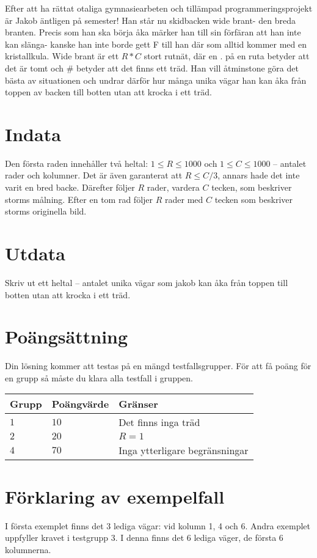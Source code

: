 Efter att ha rättat otaliga gymnasiearbeten och tillämpad programmeringsprojekt är Jakob äntligen på semester! Han står nu skidbacken wide brant- den breda branten.
Precis som han ska börja åka märker han till sin förfäran att han inte kan slänga- kanske han inte borde gett F till han där som alltid kommer med en kristallkula.
Wide brant är ett $R*C$ stort rutnät, där en . på en ruta betyder att det är tomt och \# betyder att det finns ett träd. 
Han vill åtminstone göra det bästa av situationen och undrar därför hur många unika vägar han kan åka från toppen av backen till botten utan att krocka i ett träd.

\section*{Indata}
Den första raden innehåller två heltal: $1\leq R \leq 1000$ och $1 \leq C \leq 1000$ -- antalet rader och kolumner. Det är även garanterat att $R \leq C/3$, annars hade det inte varit en bred backe.
Därefter följer $R$ rader, vardera $C$ tecken, som beskriver storms målning. 
Efter en tom rad följer $R$ rader med $C$ tecken som beskriver storms originella bild. 

\section*{Utdata}
Skriv ut ett heltal -- antalet unika vägar som jakob kan åka från toppen till botten utan att krocka i ett träd.

\section*{Poängsättning}
Din lösning kommer att testas på en mängd testfallsgrupper.
För att få poäng för en grupp så måste du klara alla testfall i gruppen.

\noindent
\begin{tabular}{| l | l | p{12cm} |}
  \hline
  Grupp & Poängvärde & Gränser \\ \hline
  $1$   & $10$       & Det finns inga träd \\ \hline
  $2$   & $20$       & $R=1$ \\ \hline
  $4$   & $70$       & Inga ytterligare begränsningar  \\ \hline
\end{tabular}

\section*{Förklaring av exempelfall}
I första exemplet finns det 3 lediga vägar: vid kolumn 1, 4 och 6.
Andra exemplet uppfyller kravet i testgrupp 3. I denna finns det 6 lediga väger, de första 6 kolumnerna.